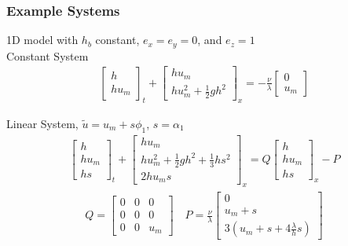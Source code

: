 \documentclass[10pt]{beamer}
\begin{document}
      \begin{frame}
        \frametitle{Example Systems}
        1D model with \(h_b\) constant, \(e_x = e_y = 0\), and \(e_z = 1\) \\
        Constant System
        \begin{align*}
          \begin{bmatrix}
            h \\
            h u_m
          \end{bmatrix}_t +
          \begin{bmatrix}
            h u_m \\
            h u_m^2 + \frac{1}{2} g h^2
          \end{bmatrix}_x =
          -\frac{\nu}{\lambda}
          \begin{bmatrix}
            0 \\
            u_m
          \end{bmatrix}
        \end{align*}


        Linear System, \(\tilde{u} = u_m + s\phi_1\), \(s = \alpha_1\)
        \begin{align*}
          \begin{bmatrix}
            h \\
            hu_m \\
            hs
          \end{bmatrix}_t +
          \begin{bmatrix}
            h u_m \\
            h u_m^2 + \frac{1}{2} gh^2 + \frac{1}{3}hs^2 \\
            2 h u_m s
          \end{bmatrix}_x = Q
          \begin{bmatrix}
            h \\
            hu_m \\
            hs
          \end{bmatrix}_x - P
        \end{align*}
        \begin{align*}
          Q =
          \begin{bmatrix}
            0 & 0 & 0 \\
            0 & 0 & 0 \\
            0 & 0 & u_m
          \end{bmatrix} \quad
          P = \frac{\nu}{\lambda}
          \begin{bmatrix}
            0 \\
            u_m + s \\
            3(u_m + s + 4\frac{\lambda}{h}s)
          \end{bmatrix}
        \end{align*}
      \end{frame}
\end{document}
